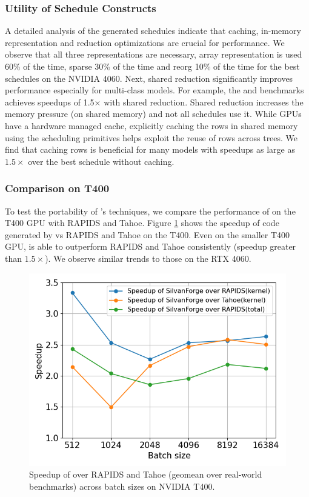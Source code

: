 \subsubsection*{Utility of Schedule Constructs}
A detailed analysis of the generated schedules indicate that caching, in-memory representation 
and reduction optimizations are crucial for performance. We observe that all three representations 
are necessary, array representation is used 60\% of the time, sparse 30\% of the time and reorg 
10\% of the time for the best schedules on the NVIDIA 4060.  
Next, shared reduction significantly improves performance especially for multi-class models. For example, 
the  and  benchmarks achieves speedups of 1.5$\times$ with shared reduction. 
Shared reduction increases the memory pressure (on shared memory) and not all schedules use it.
While GPUs have a hardware managed cache, explicitly caching the rows in shared memory using the scheduling primitives 
helps exploit the reuse of rows across trees. We find that caching rows is beneficial for many models
with speedups as large as $1.5\times$ over the best schedule without caching.

\subsubsection*{Comparison on T400}
To test the portability of \Treebeard{}'s techniques, we compare the performance 
of \Treebeard{} on the T400 GPU with RAPIDS and Tahoe. Figure \ref{Fig:TBvsRAPIDSTahoe_T400_Speedup}
shows the speedup of code generated by \Treebeard{} vs RAPIDS and Tahoe on the T400.
Even on the smaller T400 GPU, \Treebeard{} is able to outperform RAPIDS
and Tahoe consistently (speedup greater than $1.5\times$). We observe similar trends to those on the RTX 4060.

\begin{figure}[htb]
  \centering
  \includegraphics[width=0.65\linewidth]{figures/geomean_speedup_T400_kernel_time.png}
  \caption{Speedup of \Treebeard{} over RAPIDS and Tahoe (geomean over real-world 
  benchmarks) across batch sizes on NVIDIA T400.}
  \label{Fig:TBvsRAPIDSTahoe_T400_Speedup}
\end{figure}

